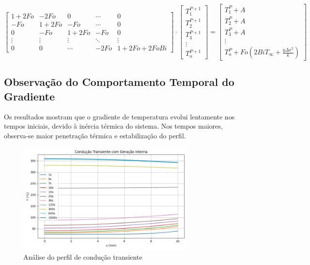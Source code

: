 \documentclass[12pt]{article}
\begin{document}
\[
\begin{bmatrix}
1 + 2Fo   & -2Fo      & 0         & \cdots & 0 \\
-Fo       & 1 + 2Fo   & -Fo       & \cdots & 0 \\
0         & -Fo       & 1 + 2Fo   & -Fo    & 0 \\
\vdots    & \vdots    & \vdots    & \ddots & \vdots \\
0      & 0         & \cdots    & -2Fo    & 1 + 2Fo + 2Fo Bi
\end{bmatrix}
\cdot
\begin{bmatrix}
T_1^{P+1} \\
T_2^{P+1} \\
T_3^{P+1} \\
\vdots \\
T_n^{P+1}
\end{bmatrix}
=
\begin{bmatrix}
T_1^P + A \\
T_2^P + A \\
T_3^P + A \\
\vdots \\
T_n^P + Fo \left(2BiT_\infty + \frac{\dot{q}\Delta x^2}{k}\right)
\end{bmatrix}
\]

\subsection{Observação do Comportamento Temporal do Gradiente}

Os resultados mostram que o gradiente de temperatura evolui lentamente nos tempos iniciais, devido à inércia térmica do sistema. Nos tempos maiores, observa-se maior penetração térmica e estabilização do perfil.

\begin{figure}[H]
    \centering
    \includegraphics[width=0.8\textwidth]{img/Figure_3.png}
    \caption{Análise do perfil de condução transiente}
\end{figure}
\end{document}
